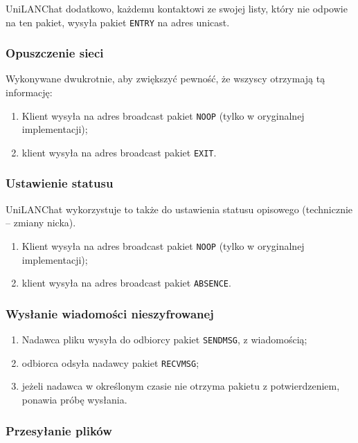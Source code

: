\documentclass[11pt,leqno]{article}
\begin{document}
UniLANChat dodatkowo, każdemu kontaktowi ze swojej listy, który nie odpowie na ten pakiet,
wysyła pakiet \texttt{ENTRY} na adres unicast.

\subsubsection{Opuszczenie sieci}

Wykonywane dwukrotnie, aby zwiększyć pewność, że wszyscy otrzymają tą informację:
\begin{enumerate}
	\item Klient wysyła na adres broadcast pakiet \texttt{NOOP} (tylko w oryginalnej
	implementacji);
	\item klient wysyła na adres broadcast pakiet \texttt{EXIT}.
\end{enumerate}

\subsubsection{Ustawienie statusu}

UniLANChat wykorzystuje to także do ustawienia statusu opisowego (technicznie -- zmiany nicka).
\begin{enumerate}
	\item Klient wysyła na adres broadcast pakiet \texttt{NOOP} (tylko w oryginalnej
	implementacji);
	\item klient wysyła na adres broadcast pakiet \texttt{ABSENCE}.
\end{enumerate}

\subsubsection{Wysłanie wiadomości nieszyfrowanej}\label{sec:scenario:message}

\begin{enumerate}
	\item Nadawca pliku wysyła do odbiorcy pakiet \texttt{SENDMSG}, z wiadomością;
	\item odbiorca odsyła nadawcy pakiet \texttt{RECVMSG};
	\item jeżeli nadawca w określonym czasie nie otrzyma pakietu z potwierdzeniem,
	ponawia próbę wysłania.
\end{enumerate}

\subsubsection{Przesyłanie plików}
\end{document}
